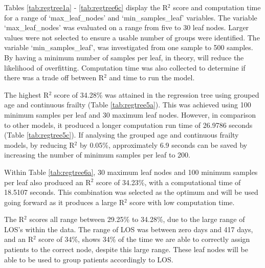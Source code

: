 \documentclass[../thesis.tex]{subfiles}
\begin{document}
Tables \ref{tab:regtree1a} - \ref{tab:regtree6c} display the R$^{2}$ score and computation time for a range of `max\_leaf\_nodes' and `min\_samples\_leaf' variables.  The variable `max\_leaf\_nodes' was evaluated on a range from five to 30 leaf nodes. Larger values were not selected to ensure a usable number of groups were identified. The variable `min\_samples\_leaf', was investigated from one sample to 500 samples. By having a minimum number of samples per leaf, in theory, will reduce the likelihood of overfitting. Computation time was also collected to determine if there was a trade off between R$^{2}$ and time to run the model.

The highest R$^{2}$ score of 34.28\% was attained in the regression tree using grouped age and continuous frailty (Table \ref{tab:regtree5a}). This was achieved using 100 minimum samples per leaf and 30 maximum leaf nodes. However, in comparison to other models, it produced a longer computation run time of 26.9786 seconds (Table \ref{tab:regtree5c}). If analysing the grouped age and continuous frailty models, by reducing R$^{2}$ by 0.05\%, approximately 6.9 seconds can be saved by increasing the number of minimum samples per leaf to 200. 

Within Table \ref{tab:regtree6a}, 30 maximum leaf nodes and 100 minimum samples per leaf also produced an R$^{2}$ score of 34.23\%, with a computational time of 18.5107 seconds. This combination was selected as the optimum and will be used going forward as it produces a large R$^{2}$ score with low computation time.

The R$^{2}$ scores all range between 29.25\% to 34.28\%, due to the large range of LOS's within the data. The range of LOS was between zero days and 417 days, and an R$^{2}$ score of 34\%, shows 34\% of the time we are able to correctly assign patients to the correct node, despite this large range. These leaf nodes will be able to be used to group patients accordingly to LOS.
\end{document}
